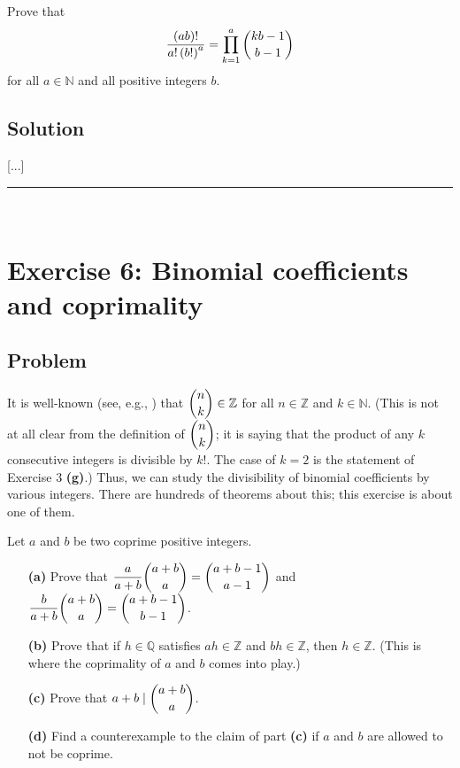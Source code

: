 \documentclass[paper=a4, fontsize=12pt]{scrartcl} %
\newcommand{\QQ}{\mathbb{Q}} %
\newcommand{\NN}{\mathbb{N}} %
\newcommand{\ZZ}{\mathbb{Z}} %
\newcommand{\tup}[1]{\left( #1 \right)}
\newcommand{\horrule}[1]{\rule{\linewidth}{#1}} %
\let\prodnonlimits\prod
\renewcommand{\prod}{\prodnonlimits\limits}
\theoremstyle{plainsl}
\theoremstyle{definition}
\theoremstyle{remark}
\begin{document}
Prove that
\[
\dfrac{\tup{ab}!}{a! \tup{b!}^a}
= \prod_{k=1}^a \dbinom{kb-1}{b-1}
\]
for all $a \in \NN$ and all positive integers $b$.

\subsection{Solution}

[...]

\horrule{0.3pt} \\[0.4cm]

\section{Exercise 6: Binomial coefficients and coprimality}

\subsection{Problem}

It is well-known (see, e.g., \cite[Proposition 3.20]{detnotes})
that $\dbinom{n}{k} \in \ZZ$ for all $n \in \ZZ$ and $k \in \NN$.
(This is not at all clear from the definition of $\dbinom{n}{k}$;
it is saying that the product of any $k$ consecutive integers
is divisible by $k!$.
The case of $k = 2$ is the statement of Exercise 3 \textbf{(g)}.)
Thus, we can study the divisibility of binomial coefficients
by various integers.
There are hundreds of theorems about this; this exercise is
about one of them.

Let $a$ and $b$ be two coprime positive integers.

\begin{enumerate}

\item[\textbf{(a)}]
Prove that $\dfrac{a}{a+b} \dbinom{a+b}{a} = \dbinom{a+b-1}{a-1}$
and $\dfrac{b}{a+b} \dbinom{a+b}{a} = \dbinom{a+b-1}{b-1}$.

\item[\textbf{(b)}]
Prove that if $h \in \QQ$ satisfies $ah \in \ZZ$ and $bh \in \ZZ$,
then $h \in \ZZ$.
(This is where the coprimality of $a$ and $b$ comes into play.)

\item[\textbf{(c)}]
Prove that $a+b \mid \dbinom{a+b}{a}$.

\item[\textbf{(d)}]
Find a counterexample to the claim of part \textbf{(c)} if
$a$ and $b$ are allowed to not be coprime.

\end{enumerate}
\end{document}
